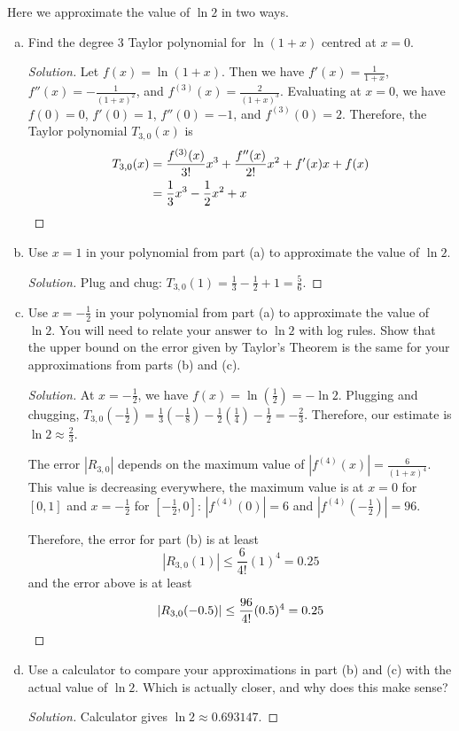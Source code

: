 \question Here we approximate the value of $\ln 2$ in two ways.
\begin{enumerate}[(a)]
  \item Find the degree 3 Taylor polynomial for $\ln(1+x)$ centred at $x = 0$.
        \begin{proof}[Solution]
          Let $f(x) = \ln(1+x)$.
          Then we have $f'(x) = \frac{1}{1+x}$, $f''(x) = -\frac{1}{(1+x)^2}$,
          and $f^{(3)}(x) = \frac{2}{(1+x)^3}$.
          Evaluating at $x=0$, we have $f(0) = 0$, $f'(0) = 1$, $f''(0) = -1$, and $f^{(3)}(0)=2$.
          Therefore, the Taylor polynomial $T_{3,0}(x)$ is
          \begin{align*}
            T_{3,0}(x) & = \frac{f^{(3)}(x)}{3!}x^3 + \frac{f''(x)}{2!}x^2 + f'(x) x + f(x) \\
                       & = \frac{1}{3}x^3 - \frac{1}{2}x^2 + x \qedhere
          \end{align*}
        \end{proof}
  \item Use $x=1$ in your polynomial from part (a) to approximate the value of $\ln 2$.
        \begin{proof}[Solution]
          Plug and chug: $T_{3,0}(1) = \frac{1}{3} - \frac{1}{2} + 1 = \frac{5}{6}$.
        \end{proof}
  \item Use $x=-\frac12$ in your polynomial from part (a) to approximate the value of $\ln 2$.
        You will need to relate your answer to $\ln 2$ with log rules.
        Show that the upper bound on the error given by Taylor's Theorem is the same
        for your approximations from parts (b) and (c).
        \begin{proof}[Solution]
          At $x=-\frac12$, we have $f(x) = \ln(\frac12) = -\ln 2$. Plugging and chugging,
          $T_{3,0}(-\frac12) = \frac13(-\frac18) - \frac12(\frac14) - \frac12 = -\frac23$.
          Therefore, our estimate is $\ln 2 \approx \frac23$.

          The error $|R_{3,0}|$ depends on the maximum value of $|f^{(4)}(x)| = \frac{6}{(1+x)^4}$.
          This value is decreasing everywhere, the maximum value is at $x=0$ for $[0,1]$
          and $x=-\frac12$ for $[-\frac12,0]$: $|f^{(4)}(0)| = 6$ and $|f^{(4)}(-\frac12)| = 96$.

          Therefore, the error for part (b) is at least
          \[ |R_{3,0}(1)| \leq \frac{6}{4!}(1)^4 = 0.25 \]
          and the error above is at least
          \[ |R_{3,0}(-0.5)| \leq \frac{96}{4!}(0.5)^4 = 0.25 \qedhere \]
        \end{proof}
  \item Use a calculator to compare your approximations in part (b) and (c)
        with the actual value of $\ln 2$. Which is actually closer, and why does this make sense?
        \begin{proof}[Solution]
          Calculator gives $\ln 2 \approx 0.693147$.


\end{proof}
\end{enumerate}
